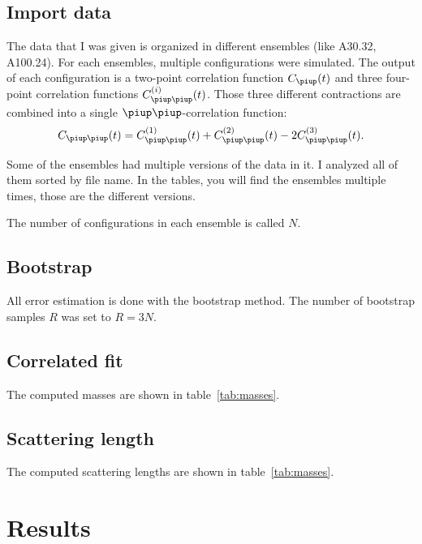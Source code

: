 \documentclass[11pt, english, fleqn, DIV=15, headinclude]{scrartcl}
\begin{document}
\subsection{Import data}

The data that I was given is organized in different ensembles (like A30.32,
A100.24). For each ensembles, multiple configurations were simulated. The
output of each configuration is a two-point correlation function $C_\piup(t)$
and three four-point correlation functions $C_{\piup\piup}^{(i)}(t)$. Those
three different contractions are combined into a single
$\piup\piup$-correlation function:
\[
    C_{\piup\piup}(t) = C_{\piup\piup}^{(1)}(t) + C_{\piup\piup}^{(2)}(t)
    - 2 C_{\piup\piup}^{(3)}(t).
\]

Some of the ensembles had multiple versions of the data in it. I analyzed all
of them sorted by file name. In the tables, you will find the ensembles
multiple times, those are the different versions.

The number of configurations in each ensemble is called $N$.

\subsection{Bootstrap}

All error estimation is done with the bootstrap method. The number of bootstrap
samples $R$ was set to $R = 3N$.

\subsection{Correlated fit}

The computed masses are shown in table~\ref{tab:masses}.

\subsection{Scattering length}

The computed scattering lengths are shown in table~\ref{tab:masses}.

\section{Results}
\end{document}
